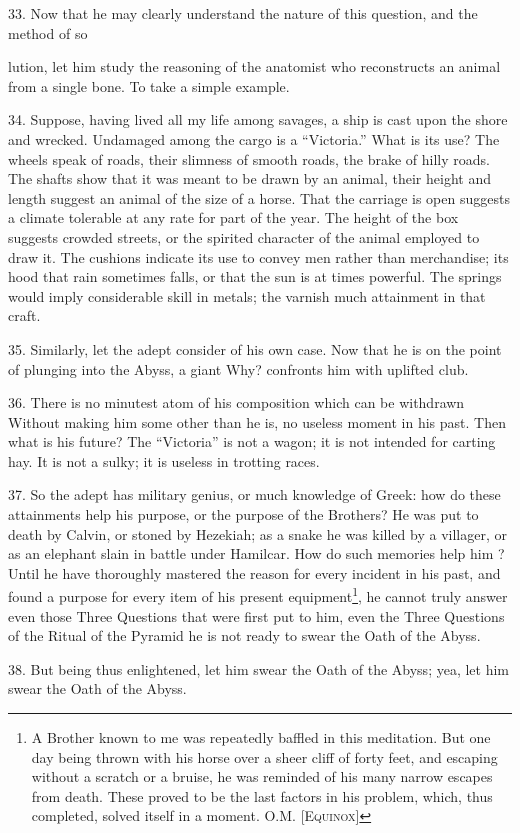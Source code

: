33. Now that he may clearly understand the nature of this question, and the method of so

lution, let him study the reasoning of the anatomist who reconstructs an animal from a single bone. To take a simple example.

34. Suppose, having lived all my life among savages, a ship is cast upon the shore and wrecked. Undamaged among the cargo is a \enquote{Victoria.} What is its use? The wheels speak of roads, their slimness of smooth roads, the brake of hilly roads. The shafts show that it was meant to be drawn by an animal, their height and length suggest an animal of the size of a horse. That the carriage is open suggests a climate tolerable at any rate for part of the year. The height of the box suggests crowded streets, or the spirited character of the animal employed to draw it. The cushions indicate its use to convey men rather than merchandise; its hood that rain sometimes falls, or that the sun is at times powerful. The springs would imply considerable skill in metals; the varnish much attainment in that craft.

35. Similarly, let the adept consider of his own case. Now that he is on the point of plunging into the Abyss, a giant Why? confronts him with uplifted club.

36. There is no minutest atom of his composition which can be withdrawn Without making him some other than he is, no useless moment in his past. Then what is his future? The \enquote{Victoria} is not a wagon; it is not intended for carting hay. It is not a sulky; it is useless in trotting races.

37. So the adept has military genius, or much knowledge of Greek: how do these attainments help his purpose, or the purpose of the Brothers? He was put to death by Calvin, or stoned by Hezekiah; as a snake he was killed by a villager, or as an elephant slain in battle under Hamilcar. How do such memories help him ? Until he have thoroughly mastered the reason for every incident in his past, and found a purpose for every item of his present equipment\footnote{A Brother known to me was repeatedly baffled in this meditation. But one day being thrown with his horse over a sheer cliff of forty feet, and escaping without a scratch or a bruise, he was reminded of his many narrow escapes from death. These proved to be the last factors in his problem, which, thus completed, solved itself in a moment. O.M. \textsc{[Equinox]}}, he cannot truly answer even those Three Questions that were first put to him, even the Three Questions of the Ritual of the Pyramid he is not ready to swear the Oath of the Abyss.

38. But being thus enlightened, let him swear the Oath of the Abyss; yea, let him swear the Oath of the Abyss.

